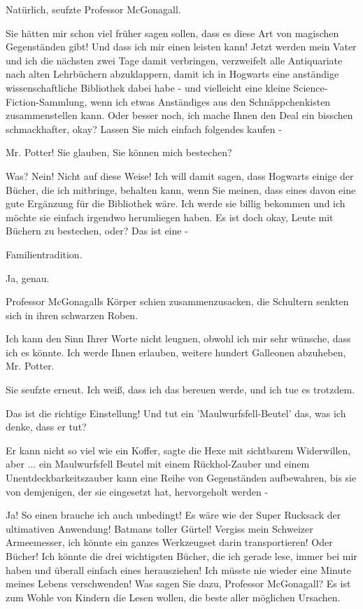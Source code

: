 \glqq Natürlich\grqq{}, seufzte Professor McGonagall.

\glqq Sie hätten mir schon viel früher sagen sollen, dass es diese Art von
magischen Gegenständen gibt! Und dass ich mir einen leisten kann! Jetzt werden
mein Vater und ich die nächsten zwei Tage damit verbringen, verzweifelt alle
Antiquariate nach alten Lehrbüchern abzuklappern, damit ich in Hogwarts eine
anständige wissenschaftliche Bibliothek dabei habe - und vielleicht eine kleine
Science-Fiction-Sammlung, wenn ich etwas Anständiges aus den Schnäppchenkisten
zusammenstellen kann. Oder besser noch, ich mache Ihnen den Deal ein bisschen
schmackhafter, okay? Lassen Sie mich einfach folgendes kaufen -\grqq{}

\glqq Mr. Potter! Sie glauben, Sie können mich bestechen?\grqq{}

\glqq Was? Nein! Nicht auf diese Weise! Ich will damit sagen, dass Hogwarts
einige der Bücher, die ich mitbringe, behalten kann, wenn Sie meinen, dass eines
davon eine gute Ergänzung für die Bibliothek wäre. Ich werde sie billig bekommen
und ich möchte sie einfach irgendwo herumliegen haben. Es ist doch okay, Leute
mit Büchern zu bestechen, oder? Das ist eine -\grqq{}

\glqq Familientradition.\grqq{}

\glqq Ja, genau.\grqq{}

Professor McGonagalls Körper schien zusammenzusacken, die Schultern senkten sich
in ihren schwarzen Roben.

\glqq Ich kann den Sinn Ihrer Worte nicht leugnen, obwohl ich mir sehr wünsche,
dass ich es könnte. Ich werde Ihnen erlauben, weitere hundert Galleonen
abzuheben, Mr. Potter.\grqq{}

Sie seufzte erneut. \glqq Ich weiß, dass ich das bereuen werde, und ich tue es
trotzdem.\grqq{}

\glqq Das ist die richtige Einstellung! Und tut ein 'Maulwurfsfell-Beutel' das,
was ich denke, dass er tut?\grqq{}

\glqq Er kann nicht so viel wie ein Koffer\grqq{}, sagte die Hexe mit sichtbarem
Widerwillen, \glqq aber ... ein Maulwurfsfell Beutel mit einem Rückhol-Zauber
und einem Unentdeckbarkeitszauber kann eine Reihe von Gegenständen aufbewahren,
bis sie von demjenigen, der sie eingesetzt hat, hervorgeholt werden -\grqq{}

\glqq Ja! So einen brauche ich auch unbedingt! Es wäre wie der Super Rucksack
der ultimativen Anwendung! Batmans toller Gürtel! Vergiss mein Schweizer
Armeemesser, ich könnte ein ganzes Werkzeugset darin transportieren! Oder
Bücher! Ich könnte die drei wichtigsten Bücher, die ich gerade lese, immer bei
mir haben und überall einfach eines herausziehen! Ich müsste nie wieder eine
Minute meines Lebens verschwenden! Was sagen Sie dazu, Professor McGonagall? Es
ist zum Wohle von Kindern die Lesen wollen, die beste aller möglichen
Ursachen.\grqq{}

